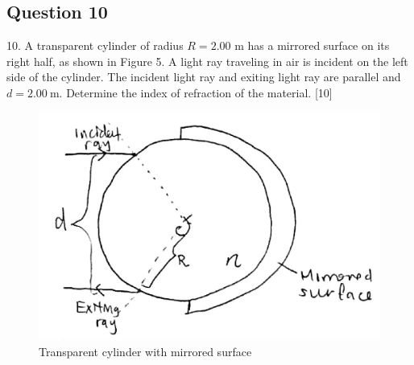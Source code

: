 \documentclass{article}
\begin{document}
\subsection{Question 10}
10. A transparent cylinder of radius $R=2.00$ m has a mirrored surface on its right half, as shown in Figure 5. A light ray traveling in air is incident on the left side of the cylinder. The incident light ray and exiting light ray are parallel and $d=2.00 \mathrm{~m}$. Determine the index of refraction of the material. [10]

\begin{figure}
	\centering
	\includegraphics[width=0.5\linewidth]{spho_book_TYS_images/2013q10.png}
	\caption{Transparent cylinder with mirrored surface}
\end{figure}
\end{document}
